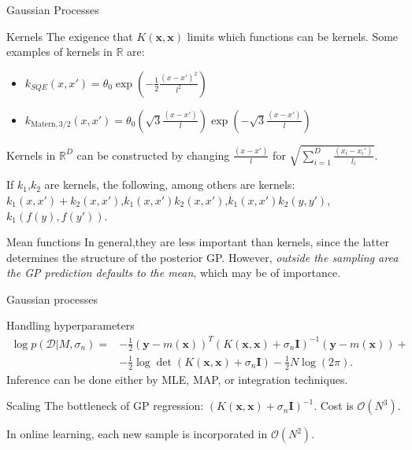 \documentclass[pdf]{beamer}
\begin{document}
\begin{frame}{Gaussian Processes}
\begin{block}{Kernels}
The exigence that $K(\mathbf{x},\mathbf{x})$ limits which functions can be kernels. Some examples of kernels in $\mathbb{R}$ are:
\begin{itemize}
	\item $k_{SQE}(x,x') = \theta_0 \exp \left(-\frac{1}{2} \frac{(x-x')^2}{l^2} \right)$
	\item $k_{\text{Matern},3/2}(x,x') = \theta_0 \left( \sqrt{3} \frac{(x-x')}{l} \right) \exp \left(-\sqrt{3} \frac{(x-x')}{l}\right)$
\end{itemize}
Kernels in $\mathbb{R}^D$ can be constructed by changing $\frac{(x-x')}{l}$ for $\sqrt{\sum_{i=1}^D \frac{(x_i-x_i')}{l_i}}$.

If $k_1$,$k_2$ are kernels, the following, among others are kernels: $k_1(x,x')+k_2(x,x')$,$k_1(x,x')k_2(x,x')$,$k_1(x,x')k_2(y,y')$,$k_1(f(y),f(y'))$.
\end{block}
\pause
\begin{block}{Mean functions}
In general,they are less important than kernels, since the latter determines the structure of the posterior GP. However, \textit{outside the sampling area the GP prediction defaults to the mean}, which may be of importance.
\end{block}
\end{frame}

\begin{frame}{Gaussian processes}
\begin{block}{Handling hyperparameters}
\begin{equation*}
\begin{split}
\log p(\mathcal{D}|M,\sigma_n) = & -\frac{1}{2}(\mathbf{y} - m(\mathbf{x}))^T (K(\mathbf{x},\mathbf{x}) + \sigma_n \mathbf{I})^{-1} (\mathbf{y} - m(\mathbf{x})) + \\
&-\frac{1}{2} \log \det (K(\mathbf{x},\mathbf{x}) + \sigma_n \mathbf{I}) - \frac{1}{2} N \log(2\pi).
\end{split}
\end{equation*}
Inference can be done either by MLE, MAP, or integration techniques.
\end{block}
\begin{block}{Scaling}
The bottleneck of GP regression: $(K(\mathbf{x},\mathbf{x}) + \sigma_n \mathbf{I})^{-1}$. Cost is $\mathcal{O}(N^3)$.

In online learning, each new sample is incorporated in $\mathcal{O}(N^2)$.
\end{block}

\end{frame}
\end{document}
